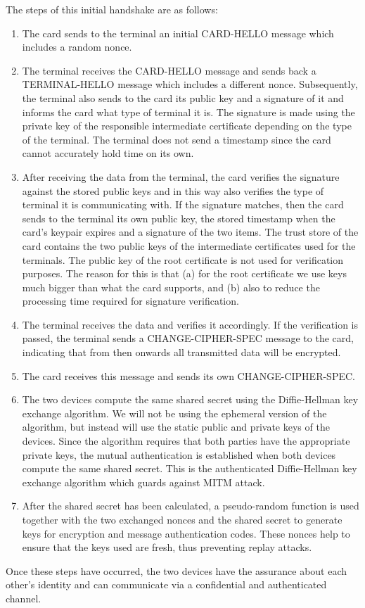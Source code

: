 The steps of this initial handshake are as follows:
\begin{enumerate}
 \item The card sends to the terminal an initial CARD-HELLO message which includes a random nonce.
 \item The terminal receives the CARD-HELLO message and sends back a TERMINAL-HELLO message which includes a different nonce. Subsequently, the terminal also sends to the card its public key and a signature of it and informs the card what type of terminal it is. The signature is made using the private key of the responsible intermediate certificate depending on the type of the terminal. The terminal does not send a timestamp since the card cannot accurately hold time on its own.
 \item After receiving the data from the terminal, the card verifies the signature against the stored public keys and in this way also verifies the type of terminal it is communicating with. If the signature matches, then the card sends to the terminal its own public key, the stored timestamp when the card's keypair expires and a signature of the two items. The trust store of the card contains the two public keys of the intermediate certificates used for the terminals. The public key of the root certificate is not used for verification purposes. The reason for this is that (a) for the root certificate we use keys much bigger than what the card supports, and (b) also to reduce the processing time required for signature verification.
 \item The terminal receives the data and verifies it accordingly. If the verification is passed, the terminal sends a CHANGE-CIPHER-SPEC message to the card, indicating that from then onwards all transmitted data will be encrypted.
 \item The card receives this message and sends its own CHANGE-CIPHER-SPEC.
 \item The two devices compute the same shared secret using the Diffie-Hellman key exchange algorithm. We will not be using the ephemeral version of the algorithm, but instead will use the static public and private keys of the devices. Since the algorithm requires that both parties have the appropriate private keys, the mutual authentication is established when both devices compute the same shared secret. This is the authenticated Diffie-Hellman key exchange algorithm which guards against MITM attack.
 \item After the shared secret has been calculated, a pseudo-random function is used together with the two exchanged nonces and the shared secret to generate keys for encryption and message authentication codes. These nonces help to ensure that the keys used are fresh, thus preventing replay attacks.
\end{enumerate}

Once these steps have occurred, the two devices have the assurance about each other's identity and can communicate via a confidential and authenticated channel.